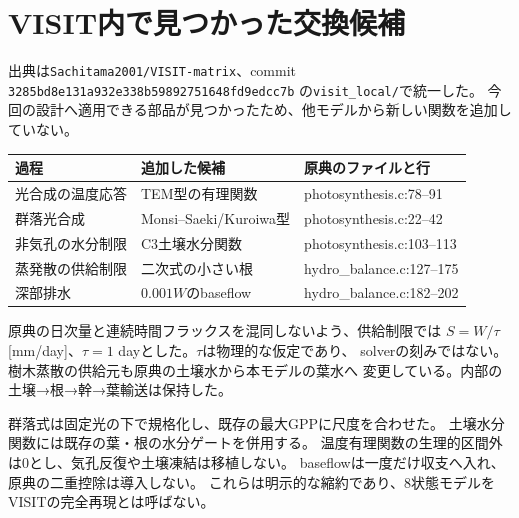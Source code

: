 \documentclass[a4paper,11pt]{ltjsarticle}
\newcommand{\code}[1]{\nolinkurl{#1}}
\begin{document}
\section{VISIT内で見つかった交換候補}
出典は\code{Sachitama2001/VISIT-matrix}、commit
\code{3285bd8e131a932e338b59892751648fd9edcc7b} の\code{visit_local/}で統一した。
今回の設計へ適用できる部品が見つかったため、他モデルから新しい関数を追加していない。

\begin{center}
\begin{tabular}{lll}
\toprule 過程 & 追加した候補 & 原典のファイルと行\\\midrule
光合成の温度応答 & TEM型の有理関数 & photosynthesis.c:78--91\\
群落光合成 & Monsi--Saeki/Kuroiwa型 & photosynthesis.c:22--42\\
非気孔の水分制限 & C3土壌水分関数 & photosynthesis.c:103--113\\
蒸発散の供給制限 & 二次式の小さい根 & hydro\_balance.c:127--175\\
深部排水 & $0.001W$のbaseflow & hydro\_balance.c:182--202\\
\bottomrule
\end{tabular}
\end{center}

原典の日次量と連続時間フラックスを混同しないよう、供給制限では
$S=W/\tau$ [mm/day]、$\tau=1$ dayとした。$\tau$は物理的な仮定であり、
solverの刻みではない。樹木蒸散の供給元も原典の土壌水から本モデルの葉水へ
変更している。内部の土壌→根→幹→葉輸送は保持した。

群落式は固定光の下で規格化し、既存の最大GPPに尺度を合わせた。
土壌水分関数には既存の葉・根の水分ゲートを併用する。
温度有理関数の生理的区間外は0とし、気孔反復や土壌凍結は移植しない。
baseflowは一度だけ収支へ入れ、原典の二重控除は導入しない。
これらは明示的な縮約であり、8状態モデルをVISITの完全再現とは呼ばない。
\end{document}
